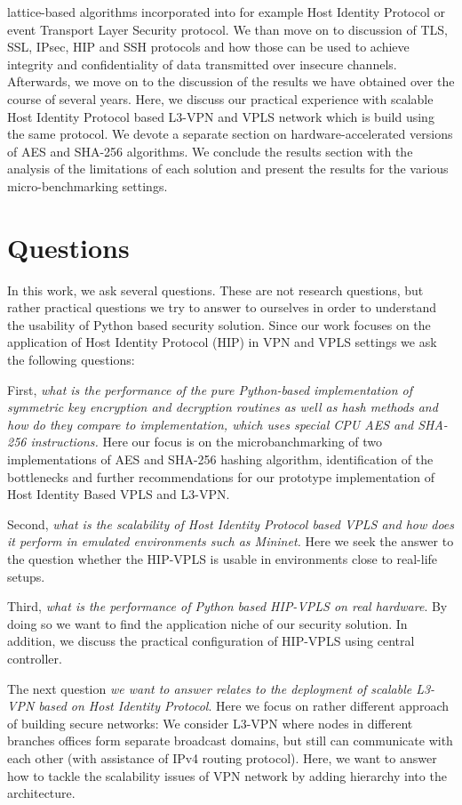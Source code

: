 lattice-based algorithms incorporated into for example Host Identity Protocol 
or event Transport Layer Security protocol. We than move on to discussion of 
TLS, SSL, IPsec, HIP and SSH protocols and how those can be used to achieve 
integrity and confidentiality of data transmitted over insecure channels. 
Afterwards, we move on to the discussion of the results we have obtained 
over the course of several years. Here, we discuss our practical experience 
with scalable Host Identity Protocol based L3-VPN and VPLS network which is 
build using the same protocol. We devote a separate section on 
hardware-accelerated versions of AES and SHA-256 algorithms. We conclude 
the results section with the analysis of the limitations of each solution 
and present the results for the various micro-benchmarking settings. 


\section{Questions}

In this work, we ask several questions. These are not research questions, 
but rather practical questions we try to answer to ourselves in order to 
understand the usability of Python based security solution. Since our work 
focuses on the application of Host Identity Protocol (HIP) in VPN and VPLS 
settings we ask the following questions:

First, {\it what is the performance of the pure Python-based implementation of 
symmetric key encryption and decryption routines as well as hash methods and 
how do they compare to implementation, which uses special CPU AES and SHA-256 
instructions.} Here our focus is on the microbanchmarking of two implementations 
of AES and SHA-256 hashing algorithm, identification of the bottlenecks and 
further recommendations for our prototype implementation of Host Identity Based VPLS and L3-VPN.

Second, {\it what is the scalability of Host Identity Protocol based VPLS and how does 
it perform in emulated environments such as Mininet.} Here we seek the answer to 
the question whether the HIP-VPLS is usable in environments close to real-life setups.

Third, {\it what is the performance of Python based HIP-VPLS on real hardware}. By 
doing so we want to find the application niche of our security solution. In addition, 
we discuss the practical configuration of HIP-VPLS using central controller.

The next question {\it we want to answer relates to the deployment of scalable L3-VPN 
based on Host Identity Protocol}. Here we focus on rather different approach of building 
secure networks: We consider L3-VPN where nodes in different branches offices form separate 
broadcast domains, but still can communicate with each other (with assistance of IPv4 
routing protocol). Here, we want to answer how to tackle the scalability issues of 
VPN network by adding hierarchy into the architecture.


